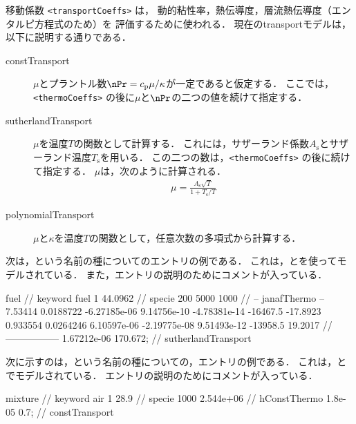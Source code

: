 移動係数 \verb|<transportCoeffs>| は，
動的粘性率，熱伝導度，層流熱伝導度（エンタルピ方程式のため）を
評価するために使われる．
現在のtransportモデルは，以下に説明する通りである．
\begin{description}
 \item[constTransport]
            $\mu$とプラントル数$\nPr = c_{\mathrm{p}}\mu/\kappa$が一定であると仮定する．
            ここでは，\verb|<thermoCoeffs>| の後に$\mu$と$\nPr$の二つの値を続けて指定する．
 \item[sutherlandTransport]
            $\mu$を温度$T$の関数として計算する．
            これには，サザーランド係数$A_{\mathrm{s}}$とサザーランド温度$T_{\mathrm{s}}$を用いる．
            この二つの数は，\verb|<thermoCoeffs>| の後に続けて指定する．
            $\mu$は，次のように計算される．
\begin{align}
 \label{eq:7.2}
 \mu = \frac{A_{\mathrm{s}}\sqrt{T}}{1 + T_{\mathrm{s}}/T}
\end{align}
 \item[polynomialTransport]
            $\mu$と$\kappa$を温度$T$の関数として，任意次数の多項式から計算する．
\end{description}
次は，という名前の種についてのエントリの例である．
これは，とを使ってモデルされている．
また，エントリの説明のためにコメントが入っている．
\begin{OFverbatim}[file]
fuel                                          // keyword
fuel 1 44.0962                                // specie
200 5000 1000                                 // -- janafThermo --
7.53414 0.0188722 -6.27185e-06 9.14756e-10 -4.78381e-14
-16467.5 -17.8923
0.933554 0.0264246 6.10597e-06 -2.19775e-08 9.51493e-12
-13958.5 19.2017                              // -----------------
1.67212e-06 170.672;                          // sutherlandTransport
\end{OFverbatim}
次に示すのは，という名前の種についての，エントリの例である．
これは，とでモデルされている．
エントリの説明のためにコメントが入っている．
\begin{OFverbatim}[file]
mixture        // keyword
air 1 28.9     // specie
1000 2.544e+06 // hConstThermo
1.8e-05 0.7;   // constTransport
\end{OFverbatim}



